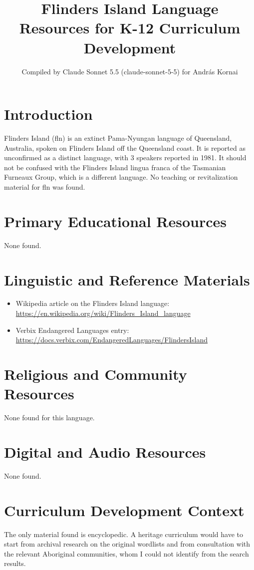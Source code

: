 \documentclass[12pt]{article}
\title{Flinders Island Language Resources for K-12 Curriculum Development}
\author{Compiled by Claude Sonnet 5.5 (claude-sonnet-5-5) for Andr\'as Kornai}
\date{}
\begin{document}
\maketitle

\section{Introduction}
Flinders Island (fln) is an extinct Pama-Nyungan language of Queensland, Australia, spoken on Flinders Island off the Queensland coast. It is reported as unconfirmed as a distinct language, with 3 speakers reported in 1981. It should not be confused with the Flinders Island lingua franca of the Tasmanian Furneaux Group, which is a different language. No teaching or revitalization material for fln was found.

\section{Primary Educational Resources}
None found.

\section{Linguistic and Reference Materials}
\begin{itemize}
\item Wikipedia article on the Flinders Island language: \url{https://en.wikipedia.org/wiki/Flinders_Island_language}
\item Verbix Endangered Languages entry: \url{https://docs.verbix.com/EndangeredLanguages/FlindersIsland}
\end{itemize}

\section{Religious and Community Resources}
None found for this language.

\section{Digital and Audio Resources}
None found.

\section{Curriculum Development Context}
The only material found is encyclopedic. A heritage curriculum would have to start from archival research on the original wordlists and from consultation with the relevant Aboriginal communities, whom I could not identify from the search results.
\end{document}
